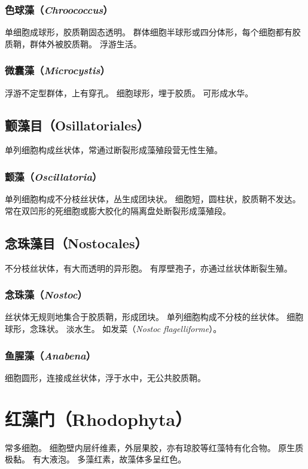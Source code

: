 \documentclass[11pt]{article}
\begin{document}
\subsubsection{色球藻（\textit{Chroococcus}）}
单细胞成球形，胶质鞘固态透明。
群体细胞半球形或四分体形，每个细胞都有胶质鞘，群体外被胶质鞘。
浮游生活。

\subsubsection{微囊藻（\textit{Microcystis}）}
浮游不定型群体，上有穿孔。
细胞球形，埋于胶质。
可形成水华。

\subsection{颤藻目（Osillatoriales）}
单列细胞构成丝状体，常通过断裂形成藻殖段营无性生殖。

\subsubsection{颤藻（\textit{Oscillatoria}）}
单列细胞构成不分枝丝状体，丛生成团块状。
细胞短，圆柱状，胶质鞘不发达。
常在双凹形的死细胞或膨大胶化的隔离盘处断裂形成藻殖段。

\subsection{念珠藻目（Nostocales）}
不分枝丝状体，有大而透明的异形胞。
有厚壁孢子，亦通过丝状体断裂生殖。

\subsubsection{念珠藻（\textit{Nostoc}）}
丝状体无规则地集合于胶质鞘，形成团块。
单列细胞构成不分枝的丝状体。
细胞球形，念珠状。
淡水生。
如发菜（\textit{Nostoc flagelliforme}）。

\subsubsection{鱼腥藻（\textit{Anabena}）}
细胞圆形，连接成丝状体，浮于水中，无公共胶质鞘。

\section{红藻门（Rhodophyta）}
常多细胞。
细胞壁内层纤维素，外层果胶，亦有琼胶等红藻特有化合物。
原生质极黏。
有大液泡。
多藻红素，故藻体多呈红色。
\end{document}
